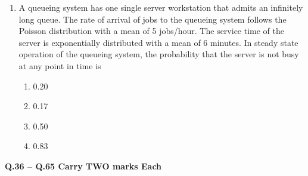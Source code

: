 \documentclass[journal,11pt,onecolumn]{IEEEtran}
\begin{document}
\begin{enumerate}[resume]
    \item A queueing system has one single server workstation that admits an infinitely long queue. The rate of arrival of jobs to the queueing system follows the Poisson distribution with a mean of 5 jobs/hour. The service time of the server is exponentially distributed with a mean of 6 minutes. In steady state operation of the queueing system, the probability that the server is not busy at any point in time is

          \begin{enumerate}
              \item 0.20
              \item 0.17
              \item 0.50
              \item 0.83
          \end{enumerate}

\end{enumerate}

\large\textbf{Q.36 – Q.65 Carry TWO marks Each}\\
\end{document}
